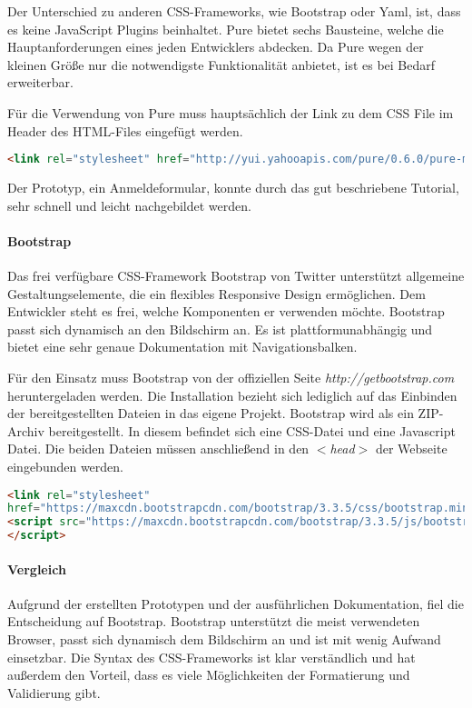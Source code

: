 Der Unterschied zu anderen CSS-Frameworks, wie Bootstrap oder Yaml, ist, dass es keine JavaScript Plugins beinhaltet. Pure bietet sechs Bausteine, welche die Hauptanforderungen eines jeden Entwicklers abdecken. Da Pure wegen der kleinen Größe nur die notwendigste Funktionalität anbietet, ist es bei Bedarf erweiterbar.

Für die Verwendung von Pure muss hauptsächlich der Link zu dem CSS File im Header des HTML-Files eingefügt werden. \cite{PURE}
\begin{lstlisting}[caption={Pure einbinden \cite{PURE}}, language=HTML]
<link rel="stylesheet" href="http://yui.yahooapis.com/pure/0.6.0/pure-min.css">
\end{lstlisting}

Der Prototyp, ein Anmeldeformular, konnte durch das gut beschriebene Tutorial, sehr schnell und leicht nachgebildet werden.

\paragraph{Bootstrap}
Das frei verfügbare CSS-Framework Bootstrap von Twitter unterstützt allgemeine Gestaltungselemente, die ein flexibles Responsive Design ermöglichen. Dem Entwickler steht es frei, welche Komponenten er verwenden möchte. Bootstrap passt sich dynamisch an den Bildschirm an. Es ist plattformunabhängig und bietet eine sehr genaue Dokumentation mit Navigationsbalken.

Für den Einsatz muss Bootstrap von der offiziellen Seite \textit{http://getbootstrap.com} heruntergeladen werden. Die Installation bezieht sich lediglich auf das Einbinden der bereitgestellten Dateien in das eigene Projekt. Bootstrap wird als ein ZIP-Archiv bereitgestellt. In diesem befindet sich eine CSS-Datei und eine Javascript Datei. Die beiden Dateien müssen anschließend in den \textit{$<$head$>$} der Webseite eingebunden werden. \cite{BOOTSTRAP}
\begin{lstlisting}[caption={Bootstrap einbinden \cite{BOOTSTRAP}}, language=HTML]
<link rel="stylesheet"
href="https://maxcdn.bootstrapcdn.com/bootstrap/3.3.5/css/bootstrap.min.css">
<script src="https://maxcdn.bootstrapcdn.com/bootstrap/3.3.5/js/bootstrap.min.js">
</script>
\end{lstlisting}

\paragraph{Vergleich}
Aufgrund der erstellten Prototypen und der ausführlichen Dokumentation, fiel die Entscheidung auf Bootstrap. Bootstrap unterstützt die meist verwendeten Browser, passt sich dynamisch dem Bildschirm an und ist mit wenig Aufwand einsetzbar. Die Syntax des CSS-Frameworks ist klar verständlich und hat außerdem den Vorteil, dass es viele Möglichkeiten der Formatierung und Validierung gibt.


